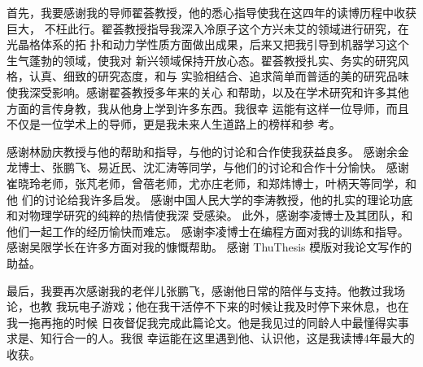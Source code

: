 \begin{acknowledgement}

首先，我要感谢我的导师翟荟教授，他的悉心指导使我在这四年的读博历程中收获巨大，
不枉此行。翟荟教授指导我深入冷原子这个方兴未艾的领域进行研究，在光晶格体系的拓
扑和动力学性质方面做出成果，后来又把我引导到机器学习这个生气蓬勃的领域，使我对
新兴领域保持开放心态。翟荟教授扎实、务实的研究风格，认真、细致的研究态度，和与
实验相结合、追求简单而普适的美的研究品味使我深受影响。感谢翟荟教授多年来的关心
和帮助，以及在学术研究和许多其他方面的言传身教，我从他身上学到许多东西。我很幸
运能有这样一位导师，而且不仅是一位学术上的导师，更是我未来人生道路上的榜样和参
考。

感谢林励庆教授与他的帮助和指导，与他的讨论和合作使我获益良多。
感谢余金龙博士、张鹏飞、易近民、沈汇涛等同学，与他们的讨论和合作十分愉快。
感谢崔晓玲老师，张芃老师，曾蓓老师，尤亦庄老师，和郑炜博士，叶柄天等同学，和他
们的讨论给我许多启发。
感谢中国人民大学的李涛教授，他的扎实的理论功底和对物理学研究的纯粹的热情使我深
受感染。
此外，感谢李凌博士及其团队，和他们一起工作的经历愉快而难忘。
感谢李凌博士在编程方面对我的训练和指导。
感谢吴限学长在许多方面对我的慷慨帮助。
感谢 ThuThesis 模版对我论文写作的助益。

最后，我要再次感谢我的老伴儿张鹏飞，感谢他日常的陪伴与支持。他教过我场论，也教
我玩电子游戏；他在我干活停不下来的时候让我及时停下来休息，也在我一拖再拖的时候
日夜督促我完成此篇论文。他是我见过的同龄人中最懂得实事求是、知行合一的人。我很
幸运能在这里遇到他、认识他，这是我读博4年最大的收获。

\end{acknowledgement}
